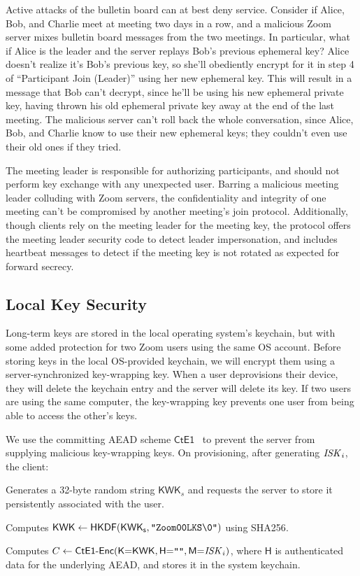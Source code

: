 Active attacks of the bulletin board can at best deny service. Consider if Alice, Bob, and Charlie meet at meeting two days in a row, and a malicious Zoom server mixes bulletin board messages from the two meetings. In particular, what if Alice is the leader and the server replays Bob's previous ephemeral key? Alice doesn't realize it's Bob's previous key, so she'll obediently encrypt for it in step 4 of ``Participant Join (Leader)'' using her new ephemeral key. This will result in a message that Bob can't decrypt, since he'll be using his new ephemeral private key, having thrown his old ephemeral private key away at the end of the last meeting. The malicious server can't roll back the whole conversation, since Alice, Bob, and Charlie know to use their new ephemeral keys; they couldn't even use their old ones if they tried.

The meeting leader is responsible for authorizing participants, and should not perform key exchange with any unexpected user. Barring a malicious meeting leader colluding with Zoom servers, the confidentiality and integrity of one meeting can't be compromised by another meeting's join protocol.  Additionally, though clients rely on the meeting leader for the meeting key, the protocol offers the meeting leader security code to detect leader impersonation, and includes heartbeat messages to detect if the meeting key is not rotated as expected for forward secrecy.

\subsection{Local Key Security}
\label{subsec:lks}

Long-term keys are stored in the local operating system's keychain, but with some added protection
for two Zoom users using the same OS account.
%
Before storing keys in the local OS-provided keychain, we will encrypt them using a server-synchronized key-wrapping key.
%
When a user deprovisions their device, they will delete the keychain entry and the server will delete its key.
%
If two users are using the same computer, the key-wrapping key prevents one user from being able to access the other's keys.

We use the committing AEAD scheme $\mathsf{CtE1}$~\cite{messagefranking} to prevent the server from supplying malicious key-wrapping keys.
%
On provisioning, after generating $\mathit{ISK}_i$, the client:
\begingroup
\RaggedRight
\begin{enumerate*}
\item Generates a 32-byte random string $\mathsf{KWK}_{s}$ and requests the server to store it persistently associated with the user.
\item Computes $\textsf{KWK} \leftarrow {\sf HKDF}(\textsf{KWK}_{\textsf{s}}, \texttt{"Zoom00LKS\textbackslash0"})$ using \textsf{SHA256}.
\item Computes $C \leftarrow \textsf{CtE1-Enc}(\textsf{K}{=}\textsf{KWK}, \textsf{H}{=}\texttt{""}, \textsf{M}{=}\mathit{ISK}_i)$, where $\textsf{H}$ is authenticated data for the underlying AEAD, and stores it in the system keychain.
\end{enumerate*}
\endgroup


